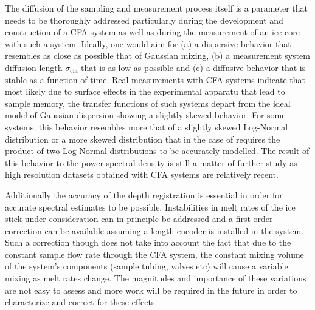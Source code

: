 \documentclass[11pt, draftcls, onecolumn]{IEEEtran} %
\numberwithin{equation}{section}
\numberwithin{table}{section}
\numberwithin{figure}{section}
\begin{document}
The diffusion of the sampling and measurement process itself is a parameter that needs to be 
thoroughly addressed particularly during the development and construction of a CFA system
as well as during the measurement of an ice core with such a system.
Ideally, one would aim for (a) a dispersive behavior  that resembles as close as possible that of Gaussian
mixing, (b) a measurement system diffusion length $\sigma_{\mathrm{cfa}}$ that is as low as possible
and (c) a diffusive behavior that is stable as a function of time.
Real measurements with CFA systems indicate that most likely due to surface effects in the experimental apparatu
that lead to sample memory, the transfer functions of such systems depart from the ideal model of
Gaussian dispersion showing a slightly skewed behavior. 
For some systems, this behavior resembles more that of a slightly skewed Log-Normal distribution \citep{Gkinis2011, Maselli2013, Emanuelsson2015}
or a more skewed distribution that in the case of \citet{Jones2017a} requires the product of two Log-Normal distributions to be accurately modelled.
The result of this behavior to the power spectral density is still a matter of further study as high resolution datasets obtained with CFA systems 
are relatively recent.

Additionally the accuracy of the depth registration is essential in order for accurate spectral estimates to be possible.
Instabilities in melt rates of the ice stick under consideration can in principle be addressed  and a first-order correction
can be available assuming a length encoder is installed in the system.
Such a correction though does not take into account the fact that due to the constant sample flow rate through the CFA system,
the constant mixing volume of the system's components (sample tubing, valves etc) will cause a variable mixing as melt rates change.
The magnitudes and importance of these variations are not easy to assess and more work will be required in the future in order 
to characterize and correct for these effects.
\end{document}
